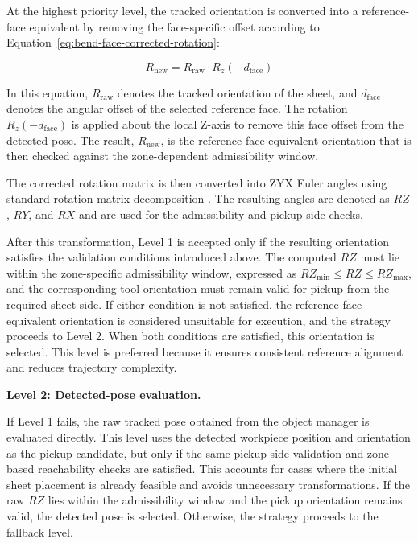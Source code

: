 At the highest priority level, the tracked orientation is converted into a reference-face equivalent by removing the face-specific offset according to Equation~\ref{eq:bend-face-corrected-rotation}:

\begin{equation}
R_{\text{new}} = R_{\text{raw}} \cdot R_z(-d_{\text{face}})
\label{eq:bend-face-corrected-rotation}
\end{equation}

In this equation, $R_{\text{raw}}$ denotes the tracked orientation of the sheet, and $d_{\text{face}}$ denotes the angular offset of the selected reference face. The rotation $R_z(-d_{\text{face}})$ is applied about the local Z-axis to remove this face offset from the detected pose. The result, $R_{\text{new}}$, is the reference-face equivalent orientation that is then checked against the zone-dependent admissibility window.

The corrected rotation matrix is then converted into ZYX Euler angles using standard rotation-matrix decomposition \cite{Siciliano2016Robotics,lynch2017modern}. The resulting angles are denoted as $RZ$, $RY$, and $RX$ and are used for the admissibility and pickup-side checks.

After this transformation, Level 1 is accepted only if the resulting orientation satisfies the validation conditions introduced above. The computed $RZ$ must lie within the zone-specific admissibility window, expressed as $RZ_{\min} \leq RZ \leq RZ_{\max}$, and the corresponding tool orientation must remain valid for pickup from the required sheet side. If either condition is not satisfied, the reference-face equivalent orientation is considered unsuitable for execution, and the strategy proceeds to Level 2. When both conditions are satisfied, this orientation is selected. This level is preferred because it ensures consistent reference alignment and reduces trajectory complexity.

\noindent\textbf{Level 2: Detected-pose evaluation.}

If Level 1 fails, the raw tracked pose obtained from the object manager is evaluated directly. This level uses the detected workpiece position and orientation as the pickup candidate, but only if the same pickup-side validation and zone-based reachability checks are satisfied. This accounts for cases where the initial sheet placement is already feasible and avoids unnecessary transformations. If the raw $RZ$ lies within the admissibility window and the pickup orientation remains valid, the detected pose is selected. Otherwise, the strategy proceeds to the fallback level.

